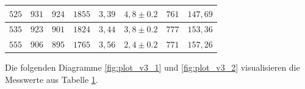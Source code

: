 \begin{table}[H]
\begin{tabular}{|l|l|l|l|l|l|l|l|}
                    \hline
                    $525$ & $931 $ & $924 $ & $1855$ & $3,39$ & $4,8 \pm 0.2$ & $761 $ & $147,69$\\
                    \hline
                    $535$ & $923 $ & $901$ & $1824 $ & $3,44$ & $3,8 \pm 0.2$ & $777 $ & $153,36$\\
                    \hline
                    $555$ & $906 $ & $895 $ & $1765$ & $3,56$ & $2,4 \pm 0.2$ & $771 $ & $157,26$\\
                    \hline
                \end{tabular}
                \label{tab:ergebnisse_v3}
            \end{table}

            Die folgenden Diagramme \ref{fig:plot_v3_1} und \ref{fig:plot_v3_2} visualisieren die Messwerte aus Tabelle \ref{tab:ergebnisse_v3}.

